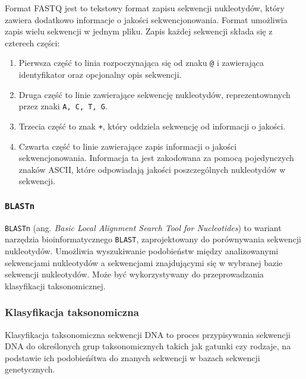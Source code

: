             Format FASTQ jest to tekstowy format zapisu sekwencji nukleotydów, który zawiera dodatkowo informacje o jakości sekwencjonowania. Format umożliwia zapis wielu sekwencji w jednym pliku. Zapis każdej sekwencji składa się z czterech części: 
            \begin{enumerate}
                \item {
                    Pierwsza część to linia rozpoczynająca się od znaku \texttt{@} i zawierająca identyfikator oraz opcjonalny opis sekwencji.
                }
                \item {
                    Druga część to linie zawierające sekwencję nukleotydów, reprezentowanych przez znaki \texttt{A, C, T, G}.
                }
                \item {
                    Trzecia część to znak \texttt{+}, który oddziela sekwencję od informacji o jakości.
                }
                \item {
                    Czwarta część to linie zawierające zapis informacji o jakości sekwencjonowania. Informacja ta jest zakodowana za pomocą pojedynczych znaków ASCII, które odpowiadają jakości poszczególnych nukleotydów w sekwencji.
                }
            \end{enumerate}

        \subsubsection{\texttt{BLASTn}}

            \texttt{BLASTn} (ang. \textit{Basic Local Alignment Search Tool for Nucleotides}) to wariant narzędzia bioinformatycznego \texttt{BLAST}, zaprojektowany do porównywania sekwencji nukleotydów. Umożliwia wyszukiwanie podobieństw między analizowanymi sekwencjami nukleotydów a sekwencjami znajdującymi się w wybranej bazie sekwencji nukleotydów. Może być wykorzystywany do przeprowadzania klasyfikacji taksonomicznej.

        \subsubsection{Klasyfikacja taksonomiczna}

            Klasyfikacja taksonomiczna sekwencji DNA to proces przypisywania sekwencji DNA do określonych grup taksonomicznych takich jak gatunki czy rodzaje, na podstawie ich podobieńśtwa do znanych sekwencji w bazach sekwencji genetycznych.

